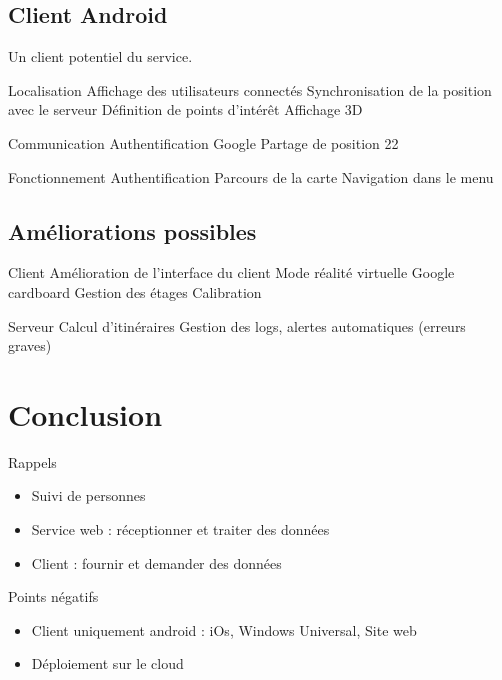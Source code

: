 \documentclass{beamer} %
\begin{document}
  \subsection{Client Android}
  \begin{frame}{\subsecname}
    Un client potentiel du service.

    Localisation
    Affichage des utilisateurs connectés
    Synchronisation de la position avec le serveur
    Définition de points d’intérêt
    Affichage 3D

    Communication
    Authentification Google
    Partage de position
    22

    Fonctionnement
    Authentification
    Parcours de la carte
    Navigation dans le menu
    
  \end{frame}

  \subsection{Améliorations possibles}
  \begin{frame}{\subsecname}
    Client
      Amélioration de l’interface du client
      Mode réalité virtuelle
        Google cardboard
      Gestion des étages
        Calibration

    Serveur
      Calcul d’itinéraires
      Gestion des logs, alertes automatiques (erreurs graves)
    
  \end{frame}
  

  \section{Conclusion}
  \begin{frame}{\secname}
      \begin{block}{Rappels}
        \begin{itemize}
          \item Suivi de personnes
          \item Service web : réceptionner et traiter des données
          \item Client : fournir et demander des données
        \end{itemize}
      \end{block}

      \pause

      \begin{alertblock}{Points négatifs}
        \begin{itemize}
          \item Client uniquement android : iOs, Windows Universal, Site web
          \item Déploiement sur le cloud
        \end{itemize}
      \end{alertblock}

  \end{frame}
\end{document}
